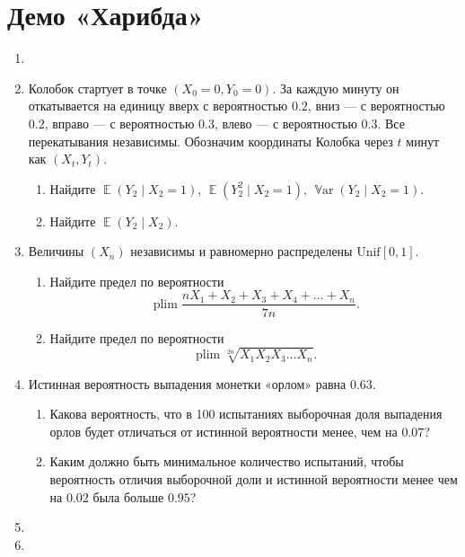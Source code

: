\documentclass[12pt]{article}
\DeclareMathOperator{\Var}{\mathbb{V}ar}
\DeclareMathOperator{\plim}{plim}
\DeclareMathOperator{\E}{\mathbb{E}}
\newcommand \dUnif{\mathrm{Unif}}
\begin{document}
\section*{Демо «Харибда»}
\begin{enumerate}
\item 
\item Колобок стартует в точке $(X_0=0, Y_0=0)$.
За каждую минуту он откатывается на единицу вверх с вероятностью $0.2$, вниз — с вероятностью $0.2$, вправо — с вероятностью $0.3$, влево — с вероятностью $0.3$.
Все перекатывания независимы. 
Обозначим координаты Колобка через $t$ минут как $(X_t, Y_t)$.
\begin{enumerate}
    \item Найдите $\E(Y_2 \mid X_2 = 1)$, $\E(Y_2^2 \mid X_2 = 1)$, $\Var(Y_2 \mid X_2 = 1)$.
    \item Найдите $\E(Y_2 \mid X_2)$.
\end{enumerate}

\item Величины $(X_n)$ независимы и равномерно распределены $\dUnif[0, 1]$.

\begin{enumerate}
  \item Найдите предел по вероятности
  \[
  \plim \frac{nX_1 + X_2 + X_3  + X_4 + \dots + X_n}{7n}.
  \]
  \item Найдите предел по вероятности
  \[
  \plim \sqrt[2n]{X_1 X_2 X_3 \dots X_n}.
  \]
\end{enumerate}

\item  Истинная вероятность выпадения монетки «орлом» равна $0.63$.
\begin{enumerate}
\item Какова вероятность, что в 100 испытаниях выборочная доля выпадения орлов будет
отличаться от истинной вероятности менее, чем на $0.07$?
\item Каким должно быть минимальное количество испытаний, чтобы вероятность отличия
выборочной доли и истинной вероятности менее чем на $0.02$ была больше $0.95$?
\end{enumerate}

\item 
\item 



\end{enumerate}
\end{document}
